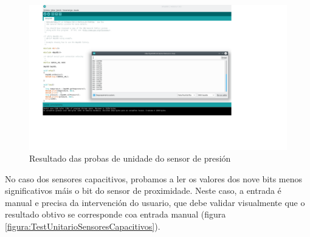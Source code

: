   \begin{figure}[htbp]
   \centering
   \includegraphics[scale=0.8,keepaspectratio=true]{./imagenes/resultado-test-sensor-presion.png}
   \caption{Resultado das probas de unidade do sensor de presión}
   \label{figura:ResultadoTestUnitarioSensorPresion}
  \end{figure}
  
  No caso dos sensores capacitivos, probamos a ler os valores dos nove bits
  menos significativos máis o bit do sensor de proximidade. Neste caso, a
  entrada é manual e precisa da intervención do usuario, que debe validar
  visualmente que o resultado obtivo se corresponde coa entrada manual
  (figura \ref{figura:TestUnitarioSensoresCapacitivos}).
   
